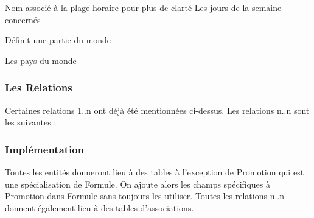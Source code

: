 \begin{itemize}
  \begin{itemize}
     Nom associé à la plage horaire pour plus de clarté
     Les jours de la semaine concernés
  \end{itemize}
   Définit une partie du monde
  \begin{itemize}
  \end{itemize}
   Les pays du monde
  \begin{itemize}
  \end{itemize}
\end{itemize}

\subsubsection{Les Relations}
Certaines relations 1..n ont déjà été mentionnées ci-dessus.
Les relations n..n sont les suivantes :
\begin {itemize}
\end {itemize}

\subsubsection{Implémentation}
Toutes les entités donneront lieu à des tables à l'exception de Promotion qui est une spécialisation de Formule. On ajoute alors les champs spécifiques à Promotion dans Formule sans toujours les utiliser.
Toutes les relations n..n donnent également lieu à des tables d'associations.


